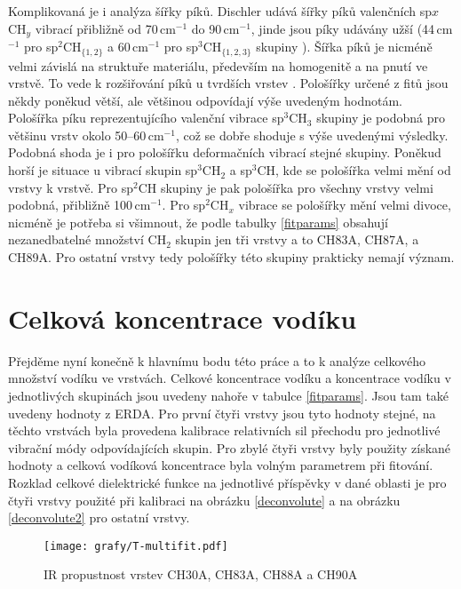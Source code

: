 Komplikovaná je i analýza šířky píků. Dischler \cite{Dischler1983} udává šířky píků valenčních sp$x$CH$_y$ vibrací přibližně od 70\,cm$^{-1}$ do 90\,cm$^{-1}$, jinde jsou píky udávány užší (44\,cm$^{-1}$ pro sp$^2$CH$_{\{1,2\}}$ a 60\,cm$^{-1}$ pro sp$^3$CH$_{\{1,2,3\}}$ skupiny \cite{Zajickova2011}). Šířka píků je nicméně velmi závislá na struktuře materiálu, především na homogenitě a na pnutí ve vrstvě. 
To vede k rozšiřování píků u tvrdších vrstev \cite{Ristein1998}. Pološířky určené z fitů jsou někdy poněkud větší, ale většinou odpovídají výše uvedeným hodnotám. Pološířka píku reprezentujícího valenční vibrace sp$^3$CH$_3$ skupiny je podobná pro většinu vrstv okolo 50--60\,cm$^{-1}$, což se dobře shoduje s výše uvedenými výsledky.
Podobná shoda je i pro pološířku deformačních vibrací stejné skupiny. Poněkud horší je situace u vibrací skupin sp$^3$CH$_2$ a sp$^3$CH, kde se pološířka velmi mění od vrstvy k vrstvě. Pro sp$^2$CH skupiny je pak pološířka pro všechny vrstvy velmi podobná, přibližně 100\,cm$^{-1}$. Pro sp$^2$CH$_x$ vibrace se pološířky mění velmi divoce, nicméně je potřeba si všimnout, že podle tabulky \ref{fitparams} obsahují nezanedbatelné množství CH$_2$ skupin jen tři vrstvy a to CH83A, CH87A, a CH89A. Pro ostatní vrstvy tedy pološířky této skupiny prakticky nemají význam.

\section{Celková koncentrace vodíku}
Přejděme nyní konečně k hlavnímu bodu této práce a to k analýze celkového množství vodíku ve vrstvách. Celkové koncentrace vodíku a koncentrace vodíku v jednotlivých skupinách jsou uvedeny nahoře v tabulce \ref{fitparams}. 
Jsou tam také uvedeny hodnoty z ERDA. Pro první čtyři vrstvy jsou tyto hodnoty stejné, na těchto vrstvách byla provedena kalibrace relativních sil přechodu pro jednotlivé vibrační módy odpovídajících skupin. 
Pro zbylé čtyři vrstvy byly použity získané hodnoty a celková vodíková koncentrace byla volným parametrem při fitování. Rozklad celkové dielektrické funkce na jednotlivé příspěvky v dané oblasti je pro čtyři vrstvy použité při kalibraci na obrázku \ref{deconvolute} a na obrázku \ref{deconvolute2} pro ostatní vrstvy.
 
\begin{figure}[htbp]
	\texttt{[image: grafy/T-multifit.pdf]}
	\caption{IR propustnost vrstev CH30A, CH83A, CH88A a CH90A}
	\label{T-multifit}
\end{figure}

